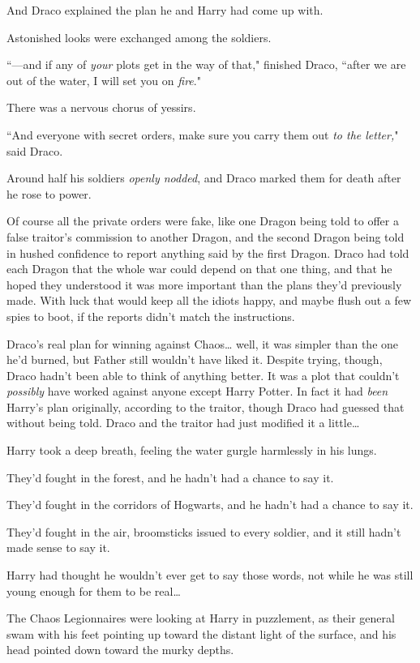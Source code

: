 And Draco explained the plan he and Harry had come up with.

Astonished looks were exchanged among the soldiers.

``—and if any of \emph{your} plots get in the way of that," finished Draco, ``after we are out of the water, I will set you on \emph{fire}."

There was a nervous chorus of yessirs.

``And everyone with secret orders, make sure you carry them out \emph{to the letter,}" said Draco.

Around half his soldiers \emph{openly nodded}, and Draco marked them for death after he rose to power.

Of course all the private orders were fake, like one Dragon being told to offer a false traitor's commission to another Dragon, and the second Dragon being told in hushed confidence to report anything said by the first Dragon. Draco had told each Dragon that the whole war could depend on that one thing, and that he hoped they understood it was more important than the plans they'd previously made. With luck that would keep all the idiots happy, and maybe flush out a few spies to boot, if the reports didn't match the instructions.

Draco's real plan for winning against Chaos{\ldots} well, it was simpler than the one he'd burned, but Father still wouldn't have liked it. Despite trying, though, Draco hadn't been able to think of anything better. It was a plot that couldn't \emph{possibly} have worked against anyone except Harry Potter. In fact it had \emph{been} Harry's plan originally, according to the traitor, though Draco had guessed that without being told. Draco and the traitor had just modified it a little{\ldots}

\later

Harry took a deep breath, feeling the water gurgle harmlessly in his lungs.

They'd fought in the forest, and he hadn't had a chance to say it.

They'd fought in the corridors of Hogwarts, and he hadn't had a chance to say it.

They'd fought in the air, broomsticks issued to every soldier, and it still hadn't made sense to say it.

Harry had thought he wouldn't ever get to say those words, not while he was still young enough for them to be real{\ldots}

The Chaos Legionnaires were looking at Harry in puzzlement, as their general swam with his feet pointing up toward the distant light of the surface, and his head pointed down toward the murky depths.

